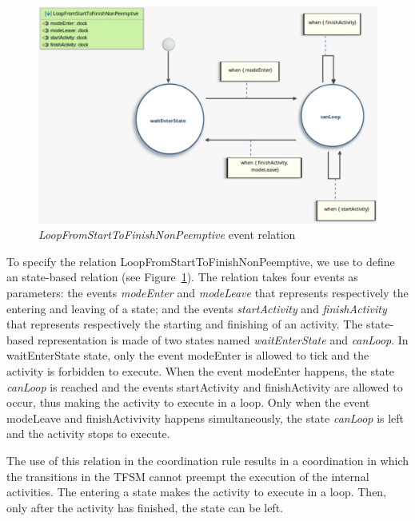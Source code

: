 \begin{figure}
	\center
	\includegraphics[width=.7\columnwidth]{examples/figs/LoopFromStartToFinishNonPreemptive}
	\caption{\emph{LoopFromStartToFinishNonPeemptive} event relation}
	\label{fig:looprelation}
\end{figure}

To specify the relation LoopFromStartToFinishNonPeemptive, we use \moccml to define an state-based relation (see Figure~\ref{fig:looprelation}). The relation takes four events as parameters: the events \emph{modeEnter} and \emph{modeLeave} that represents respectively the entering and leaving of a state; and the events \emph{startActivity} and \emph{finishActivity} that represents respectively the starting and finishing of an activity. The state-based representation is made of two states named \emph{waitEnterState} and \emph{canLoop}. In waitEnterState state, only the event modeEnter is allowed to tick and the activity is forbidden to execute. When the event modeEnter happens, the state \emph{canLoop} is reached and the events startActivity and finishActivity are allowed to occur, thus making the activity to execute in a loop. Only when the event modeLeave and finishActivivity happens simultaneously, the state \emph{canLoop} is left and the activity stops to execute. 

The use of this relation in the coordination rule results in a coordination in which the transitions in the TFSM cannot preempt the execution of the internal activities. The entering a state makes the activity to execute in a loop. Then, only after the activity has finished, the state can be left.


